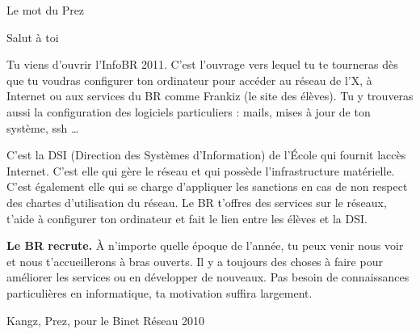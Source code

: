 

\begin{center}
    { \Huge Le mot du Prez }
\end{center}

Salut \`a toi

Tu viens d'ouvrir l'InfoBR 2011. C'est l'ouvrage vers lequel tu te tourneras d\`es que tu voudras configurer ton ordinateur pour acc\'eder au r\'eseau de l'X, \`a Internet ou aux services du BR comme Frankiz (le site des \'el\`eves). Tu y trouveras aussi la configuration des logiciels particuliers : mails, mises \`a jour de ton syst\`eme, ssh \dots
{}

C'est la DSI (Direction des Syst\`emes d'Information) de l'\'Ecole qui fournit lacc\`es Internet. C'est elle qui g\`ere le r\'eseau et qui poss\`ede l'infrastructure mat\'erielle. C'est \'egalement elle qui se charge d'appliquer les sanctions en cas de non respect des chartes d'utilisation du r\'eseau. Le BR t'offres des services sur le r\'eseaux, t'aide \`a configurer ton ordinateur et fait le lien entre les \'el\`eves et la DSI.

\textbf{Le BR recrute.} \`A n'importe quelle \'epoque de l'ann\'ee, tu peux venir nous voir et nous t'accueillerons \`a bras ouverts. Il y a toujours des choses \`a faire pour am\'eliorer les services ou en d\'evelopper de nouveaux. Pas besoin de connaissances particuli\`eres en informatique, ta motivation suffira largement.

\begin{flushright}
    Kangz, Prez, pour le Binet R\'eseau 2010
\end{flushright}

